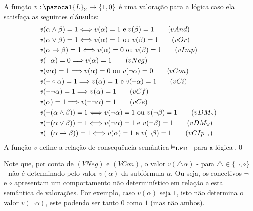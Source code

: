         \begin{definicao} 
            \label{def:valoracoes}
            A função $v : \pazocal{L}_{\Sigma} \rightarrow \{1, 0\}$ é uma valoração para a lógica \lfium{} caso ela satisfaça as seguintes cláusulas:
            \begin{align*}
                & v(\alpha \land \beta) = 1 \Longleftrightarrow v(\alpha) = 1 \text{ e } v(\beta) = 1\tag{\textbf{$vAnd$}}\\
                & v(\alpha \lor \beta) = 1 \Longleftrightarrow v(\alpha) = 1 \text{ ou } v(\beta) = 1\tag{\textbf{$vOr$}}\\
                & v(\alpha \rightarrow \beta) = 1 \Longleftrightarrow v(\alpha) = 0 \text{ ou } v(\beta) = 1\tag{\textbf{$vImp$}}\\
                & v(\neg \alpha) = 0 \Longrightarrow v(\alpha) = 1\tag{\textbf{$vNeg$}}\\
                & v(\circ \alpha) = 1 \Longrightarrow v(\alpha) = 0 \text{ ou } v(\neg \alpha) = 0\tag{\textbf{$vCon$}}\\
                & v(\neg \circ \alpha) = 1 \Longrightarrow v(\alpha) = 1 \text{ e } v(\neg \alpha) = 1\tag{\textbf{$vCi$}}\\
                & v(\neg \neg \alpha) = 1 \Longrightarrow v(\alpha) = 1\tag{\textbf{$vCf$}}\\
                & v(\alpha) = 1 \Longrightarrow v(\neg \neg \alpha) = 1\tag{\textbf{$vCe$}}\\
                & v(\neg (\alpha \land \beta)) = 1 \Longleftrightarrow v(\neg \alpha) = 1 \text{ ou } v(\neg \beta) = 1\tag{\textbf{$vDM_{\land}$}}\\
                & v(\neg (\alpha \lor \beta)) = 1 \Longleftrightarrow v(\neg \alpha) = 1 \text{ e } v(\neg \beta) = 1\tag{\textbf{$vDM_{\lor}$}}\\
                & v(\neg (\alpha \rightarrow \beta)) = 1 \Longleftrightarrow v(\alpha) = 1 \text{ e } v(\neg \beta) = 1\tag{\textbf{$vCIp_{\rightarrow}$}}
            \end{align*}
            A função $v$ define a relação de consequência semântica $\vDash_{\textbf{LFI1}{}}{}$ para a lógica \lfium{}.\qed{}
        \end{definicao}

        Note que, por conta de $(VNeg)$ e $(VCon)$, o valor $v(\triangle \alpha)$ {-} para $\triangle \in \{\neg, \circ\}$ {-} não é determinado pelo valor $v(\alpha)$ da subfórmula $\alpha$. Ou seja, os conectivos $\neg$ e $\circ$ apresentam um comportamento não determinístico em relação a esta semântica de valorações. Por exemplo, caso $v(\alpha)$ seja $1$, isto não determina o valor $v(\neg \alpha)$, este podendo ser tanto $0$ como $1$ (mas não ambos).
        
